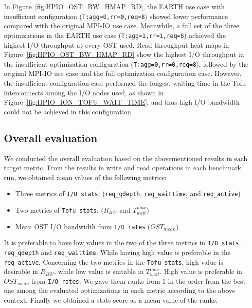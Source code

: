 \documentclass{jhps}
\begin{document}
%
In Figure~\ref{fig:HPIO_OST_BW_HMAP_RD}, the EARTH use case with insufficient configuration
({\tt T:agg=0,rr=0,req=8}) showed lower performance compared with the original MPI-IO use case.
Meanwhile, a full set of the three optimizations in the EARTH use case
({\tt T:agg=1,rr=1,req=8}) achieved the highest I/O throughput at every OST used. 
Read throughput heat-maps in Figure~\ref{fig:HPIO_OST_BW_HMAP_RD} show
the highest I/O throughput in the insufficient optimization configuration
({\tt T:agg=0,rr=0,req=8}), followed by the original MPI-IO use case
and the full optimization configuration case.
However, the insufficient configuration case performed the longest waiting time
in the Tofu interconnects among the I/O nodes used,
as shown in Figure~\ref{fig:HPIO_ION_TOFU_WAIT_TIME},
and thus high I/O bandwidth could not be achieved in this configuration.

\subsection{Overall evaluation}
\label{ssec:overall_eval}

We conducted the overall evaluation based on the abovementioned results
in each target metric.
From the results in write and read operations in each benchmark run,
we obtained mean values of the following metrics:
%
\begin{itemize}
\item Three metrics of {\tt I/O stats}:
({\tt req\_qdepth}, {\tt req\_waittime}, and {\tt req\_active})
\item Two metrics of {\tt Tofu stats}: ($R_{BW}$ and $T_{wait}^{max}$)
\item Mean OST I/O bandwidth from {\tt I/O rates} ($OST_{mean}$)
\end{itemize}
%
It is preferable to have low values in the two of the three metrics
in {\tt I/O stats}, {\tt req\_qdepth} and {\tt req\_waittime}.
While having high value is preferable in the {\tt req\_active}.
Concerning the two metrics in the {\tt Tofu stats},
high value is desirable in $R_{BW}$, while low value is
suitable in $T_{wait}^{max}$.
High value is preferable in $OST_{mean}$ from {\tt I/O rates}.
We gave them ranks from 1 in the order from the best one
among the evaluated optimizations in each metric according to
the above context.
Finally we obtained a stats score as a mean value of the ranks.
\end{document}
